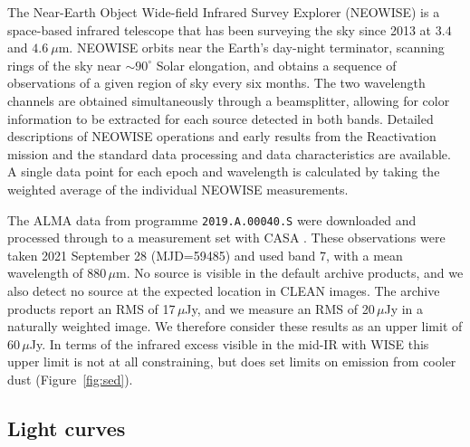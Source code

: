 \documentclass[sn-nature,oneside]{sn-jnl}%
\begin{document}

The Near-Earth Object Wide-field Infrared Survey Explorer (NEOWISE) is a space-based infrared telescope that has been surveying the sky since 2013 at $3.4$ and $4.6~\mu$m.
%
NEOWISE orbits near the Earth's day-night terminator, scanning rings of the sky near $\sim90^\circ$ Solar elongation, and obtains a sequence of observations of a given region of sky every six months.
%
The two wavelength channels are obtained simultaneously through a beamsplitter, allowing for color information to be extracted for each source detected in both bands.
%
Detailed descriptions of NEOWISE operations and early results from the Reactivation mission \cite{mainzer14neowise} and the standard data processing and data characteristics \cite{cutri15} are available.
%
A single data point for each epoch and wavelength is calculated by taking the weighted average of the individual NEOWISE measurements.



The ALMA data from programme \texttt{2019.A.00040.S} were downloaded and processed through to a measurement set with CASA \cite{2007ASPC..376..127M}.
%
These observations were taken 2021 September 28 (MJD=59485) and used band 7, with a mean wavelength of 880\,$\mu$m.
%
No source is visible in the default archive products, and we also detect no source at the expected location in CLEAN images.
%
The archive products report an RMS of 17\,$\mu$Jy, and we measure an RMS of 20\,$\mu$Jy in a naturally weighted image.
%
We therefore consider these results as an upper limit of 60\,$\mu$Jy.
%
In terms of the infrared excess visible in the mid-IR with WISE this upper limit is not at all constraining, but does set limits on emission from cooler dust (Figure~\ref{fig:sed}).

\subsection*{Light curves}
\end{document}

